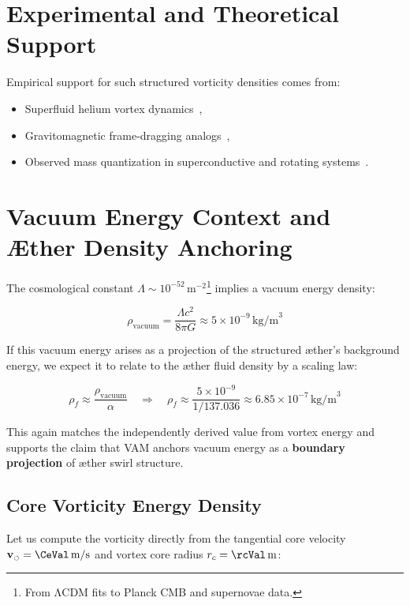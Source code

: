 \documentclass[12pt]{article}
\begin{document}
    \section{Experimental and Theoretical Support}

    Empirical support for such structured vorticity densities comes from:

    \begin{itemize}
        \item Superfluid helium vortex dynamics~\cite{jackson2021},
        \item Gravitomagnetic frame-dragging analogs~\cite{paris2015},
        \item Observed mass quantization in superconductive and rotating systems~\cite{santiago2011}.
    \end{itemize}

    \section{Vacuum Energy Context and Æther Density Anchoring}

    The cosmological constant \( \Lambda \sim 10^{-52} \, \text{m}^{-2} \)\footnote{From ΛCDM fits to Planck CMB and supernovae data.} implies a vacuum energy density:

    \[
        \rho_{\text{vacuum}} = \frac{\Lambda c^2}{8\pi G} \approx 5 \times 10^{-9} \, \text{kg/m}^3
    \]

    If this vacuum energy arises as a projection of the structured æther's background energy, we expect it to relate to the æther fluid density by a scaling law:

    \[
        \rho_{\!f} \approx \frac{\rho_{\text{vacuum}}}{\alpha}
        \quad \Rightarrow \quad
        \rho_{\!f} \approx \frac{5 \times 10^{-9}}{1/137.036} \approx 6.85 \times 10^{-7} \, \text{kg/m}^3
    \]

    This again matches the independently derived value from vortex energy and supports the claim that VAM anchors vacuum energy as a \textbf{boundary projection} of æther swirl structure.

    \subsection{Core Vorticity Energy Density}

    Let us compute the vorticity directly from the tangential core velocity \( \mathbf{v}_{\scriptscriptstyle\boldsymbol{\circlearrowleft}} = \CeVal \, \text{m/s} \) and vortex core radius \( r_c = \rcVal \, \text{m} \):
\end{document}

